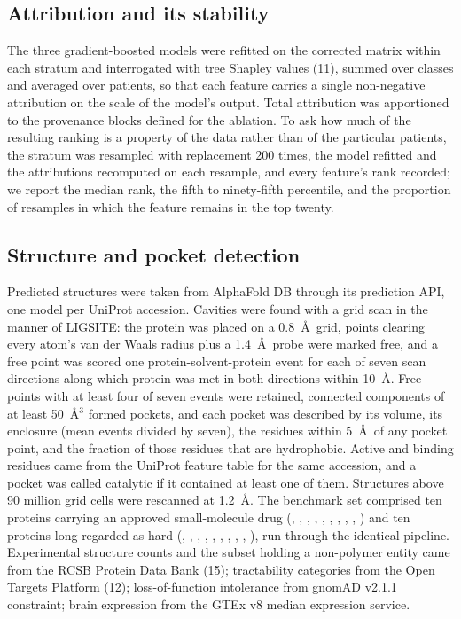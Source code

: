 \documentclass[10pt]{article}
\begin{document}
\subsection*{Attribution and its stability}

The three gradient-boosted models were refitted on the corrected matrix within each stratum and
interrogated with tree Shapley values (11), summed over classes and averaged over patients, so that
each feature carries a single non-negative attribution on the scale of the model's output. Total
attribution was apportioned to the provenance blocks defined for the ablation. To ask how much of
the resulting ranking is a property of the data rather than of the particular patients, the
stratum was resampled with replacement 200 times, the model refitted and the attributions
recomputed on each resample, and every feature's rank recorded; we report the median rank, the
fifth to ninety-fifth percentile, and the proportion of resamples in which the feature remains in
the top twenty.

\subsection*{Structure and pocket detection}

Predicted structures were taken from AlphaFold DB through its prediction API, one model per
UniProt accession. Cavities were found with a grid scan in the manner of LIGSITE: the protein was
placed on a 0.8~\AA\ grid, points clearing every atom's van der Waals radius plus a 1.4~\AA\ probe
were marked free, and a free point was scored one protein-solvent-protein event for each of seven
scan directions along which protein was met in both directions within 10~\AA. Free points with at
least four of seven events were retained, connected components of at least 50~\AA$^3$ formed
pockets, and each pocket was described by its volume, its enclosure (mean events divided by seven),
the residues within 5~\AA\ of any pocket point, and the fraction of those residues that are
hydrophobic. Active and binding residues came from the UniProt feature table for the same
accession, and a pocket was called catalytic if it contained at least one of them. Structures
above 90 million grid cells were rescanned at 1.2~\AA. The benchmark set comprised ten proteins
carrying an approved small-molecule drug (, , , ,
, , , , , ) and ten proteins
long regarded as hard (, , , , ,
, , , , ), run through the identical
pipeline. Experimental structure counts and the subset holding a non-polymer entity came from the RCSB Protein Data Bank (15); tractability categories from the Open Targets Platform (12); loss-of-function
intolerance from gnomAD v2.1.1 constraint; brain expression from the GTEx v8 median expression
service.
\end{document}
